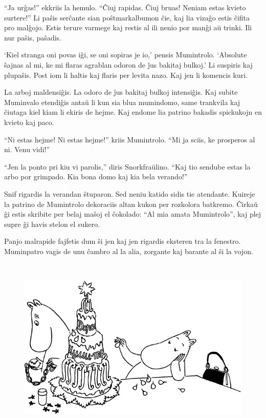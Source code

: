 ``Ja urĝas!'' ekkriis la hemulo. ``Ĉiuj rapidas. Ĉiuj bruas! Neniam estas kvieto surtere!'' Li paŝis serĉante sian poŝtmarkalbumon ĉie, kaj lia vizaĝo estis ĉifita pro malĝojo. Estis terure varmege kaj restis al ili nenio por manĝi aŭ trinki. Ili nur paŝis, paŝadis.

`Kiel stranga oni povas iĝi, se oni sopiras je io,' pensis Mumintrolo. `Absolute ŝajnas al mi, ke mi flaras agrablan odoron de ĵus bakitaj bulkoj.' Li suspiris kaj plupaŝis. Post iom li haltis kaj flaris per levita nazo. Kaj jen li komencis kuri.

La arboj maldensiĝis. La odoro de ĵus bakitaj bulkoj intensiĝis. Kaj subite Muminvalo etendiĝis antaŭ li kun sia blua mumindomo, same trankvila kaj ĉiutaga kiel kiam li ekiris de hejme. Kaj endome lia patrino bakadis spickukojn en kvieto kaj paco.

``Ni estas hejme! Ni estas hejme!'' kriis Mumintrolo. ``Mi ja sciis, ke prosperos al ni. Venu vidi!''

``Jen la ponto pri kiu vi parolis,'' diris Snorkfraŭlino. ``Kaj tio sendube estas la arbo por grimpado. Kia bona domo kaj kia bela verando!''

Snif rigardis la verandan ŝtuparon. Sed neniu katido sidis tie atendante.
\sectionbreak
Kuireje la patrino de Mumintrolo dekoraciis altan kukon per rozkolora batkremo. Ĉirkaŭ ĝi estis skribite per belaj maŝoj el ĉokolado: ``Al mia amata Mumintrolo'', kaj plej supre ĝi havis stelon el sukero.

Panjo malrapide fajfetis dum ŝi jen kaj jen rigardis eksteren tra la fenestro. Muminpatro vagis de unu ĉambro al la alia, zorgante kaj barante al ŝi la vojon.

\begin{figure}[htbp]
\centering
\includegraphics[width=400pt,height=245pt]{9-1.png}
\caption{}
\label{9-1}
\end{figure}

